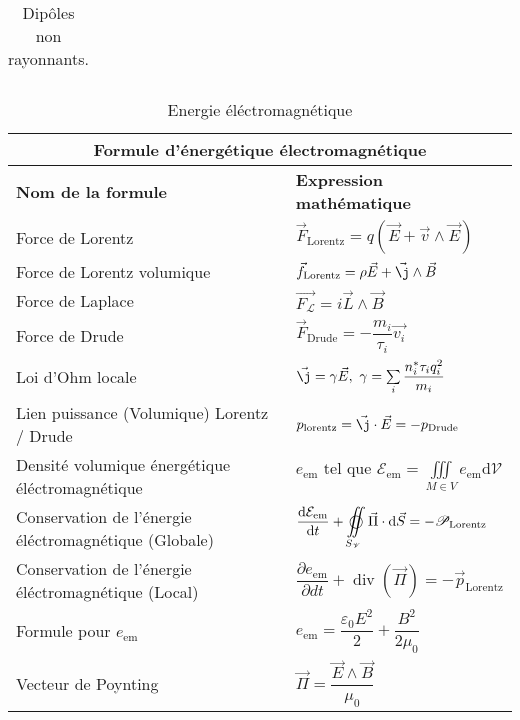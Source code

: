 \documentclass[10pt,a4paper,titlepage,portrait]{article}
\renewcommand{\d}
{
    \mathrm{d}
}
\newcommand*{\dv}[2]
{
    \dfrac{\d#1}{\d#2}
}
\newcommand*{\dpv}[2]
{
    \dfrac{\partial#1}{\partial#2}
}
\renewcommand{\div}
{
    \operatorname{div}
}
\renewcommand{\arraystretch}{2}
\begin{document}
\begin{center}
\begin{table}[H]
\begin{tabular}{@{}p{9cm}p{10cm}@{}}
    \bottomrule
\end{tabular}
\caption{Dipôles non rayonnants.}
\label{tab:denr}
\end{table}


\begin{table}[H]
    \centering
    \renewcommand{\arraystretch}{1.5} %
    \setlength{\tabcolsep}{8pt} %
    \begin{tabular}{@{}p{9cm}p{10cm}@{}}
        \toprule
        \multicolumn{2}{c}{\textbf{Formule d'énergétique électromagnétique}} \\
        \midrule
        \textbf{Nom de la formule} & \textbf{Expression mathématique} \\
        \midrule
    Force de Lorentz & $\vec{F}_{\text{Lorentz}} = q \left(\vec{E} + \vec{v} \wedge \vec{E}\right)$ \\ 
    Force de Lorentz volumique & $\vec{{f}}_{\text{Lorentz}} = \rho \vec{E} + \vec{\j}\wedge \vec{B}$ \\ 
    Force de Laplace & $\vec{F_\mathscr{L}}=i\vec{L}\wedge \vec{B}$ \\ 
    Force de Drude & $\vec{F}_{\text{Drude}} = -\dfrac{m_i}{\tau_i}\vec{v_i}$ \\ 
    Loi d'Ohm locale & $\vec{\j} = \gamma \vec{E}, \ \gamma = \sum\limits_{i}\dfrac{n_i^{*}\tau_i q_i^2}{m_i}$ \\ 
    Lien puissance (Volumique) Lorentz / Drude & $p_{\text{lorentz}} = \vec{\j}\cdot\vec{E} = -p_{\text{Drude}}$ \\ 
    Densité volumique énergétique éléctromagnétique & $\displaystyle e_{\text{em}} \text{ tel que } \mathcal{E}_{\text{em}} = \iiint\limits_{M\in V}e_{\text{em}} \text{d}\mathscr{V}$ \\ 
    Conservation de l'énergie éléctromagnétique (Globale) & $\displaystyle\dv{\mathcal{E}_{\text{em}}}{t} + \varoiint\limits_{S_{\mathscr{V}}} \vec{\Pi} \cdot \text{d} \vec{S} = -\mathscr{P}_{\text{Lorentz}}$ \\ 
    Conservation de l'énergie éléctromagnétique (Local) & $\displaystyle \dpv{e_{\text{em}}}{dt} + \div(\vec{\Pi}) = - \vec{p}_{\text{Lorentz}}$ \\ 
    Formule pour $e_{\text{em}}$ & $e_{\text{em}} = \dfrac{\varepsilon_0E^2}{2} + \dfrac{B^2}{2\mu_0}$ \\ 
    Vecteur de Poynting & $\vec{\Pi} = \dfrac{\vec{E} \wedge \vec{B}}{\mu_0}$ \\ 
    \bottomrule
\end{tabular}
\caption{Energie éléctromagnétique}
\label{tab:elec_energie}
\end{table}


\end{center}
\end{document}
